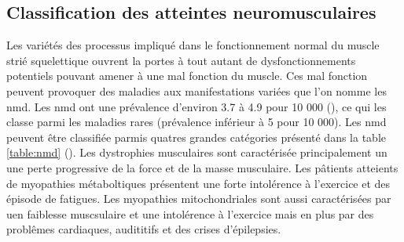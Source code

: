 \subsection{Classification des atteintes neuromusculaires}
Les variétés des processus impliqué dans le fonctionnement normal du muscle strié squelettique ouvrent la portes à tout autant de dysfonctionnements potentiels pouvant amener à une mal fonction du muscle. Ces mal fonction peuvent provoquer des maladies aux manifestations variées que l'on nomme les \gls{nmd}. Les \gls{nmd} ont une prévalence d'environ 3.7 à 4.9 pour 10 000 (\cite{lace_overview_2022}), ce qui les classe parmi les maladies rares (prévalence inférieur à 5 pour 10 000).  Les \gls{nmd} peuvent être classifiée parmis quatres grandes catégories présenté dans la table \ref{table:nmd} (\cite{lornage_identification_2019}). Les dystrophies musculaires sont caractérisée principalement un une perte progressive de la force et de la masse musculaire. Les pâtients atteients de myopathies métaboltiques présentent une forte intolérence à l'exercice et des épisode de fatigues. Les myopathies mitochondriales sont aussi caractérisées par uen faiblesse muscsulaire et une intolérence à l'exercice mais en plus par des problêmes cardiaques, audititifs et des crises d'épilepsies.

